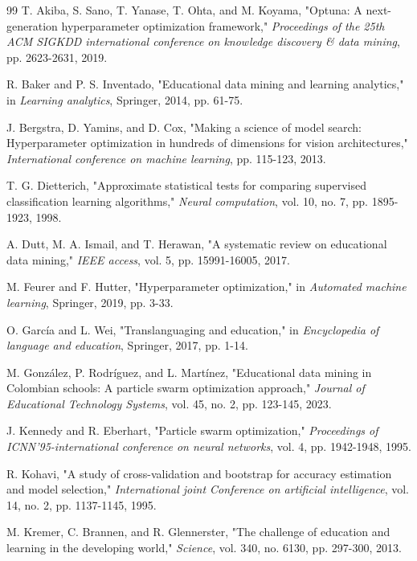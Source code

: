 \documentclass[conference]{IEEEtran}
\begin{document}
\begin{thebibliography}{99}
 T. Akiba, S. Sano, T. Yanase, T. Ohta, and M. Koyama, "Optuna: A next-generation hyperparameter optimization framework," \textit{Proceedings of the 25th ACM SIGKDD international conference on knowledge discovery \& data mining}, pp. 2623-2631, 2019.

 R. Baker and P. S. Inventado, "Educational data mining and learning analytics," in \textit{Learning analytics}, Springer, 2014, pp. 61-75.

 J. Bergstra, D. Yamins, and D. Cox, "Making a science of model search: Hyperparameter optimization in hundreds of dimensions for vision architectures," \textit{International conference on machine learning}, pp. 115-123, 2013.

 T. G. Dietterich, "Approximate statistical tests for comparing supervised classification learning algorithms," \textit{Neural computation}, vol. 10, no. 7, pp. 1895-1923, 1998.

 A. Dutt, M. A. Ismail, and T. Herawan, "A systematic review on educational data mining," \textit{IEEE access}, vol. 5, pp. 15991-16005, 2017.

 M. Feurer and F. Hutter, "Hyperparameter optimization," in \textit{Automated machine learning}, Springer, 2019, pp. 3-33.

 O. García and L. Wei, "Translanguaging and education," in \textit{Encyclopedia of language and education}, Springer, 2017, pp. 1-14.

 M. González, P. Rodríguez, and L. Martínez, "Educational data mining in Colombian schools: A particle swarm optimization approach," \textit{Journal of Educational Technology Systems}, vol. 45, no. 2, pp. 123-145, 2023.

 J. Kennedy and R. Eberhart, "Particle swarm optimization," \textit{Proceedings of ICNN'95-international conference on neural networks}, vol. 4, pp. 1942-1948, 1995.

 R. Kohavi, "A study of cross-validation and bootstrap for accuracy estimation and model selection," \textit{International joint Conference on artificial intelligence}, vol. 14, no. 2, pp. 1137-1145, 1995.

 M. Kremer, C. Brannen, and R. Glennerster, "The challenge of education and learning in the developing world," \textit{Science}, vol. 340, no. 6130, pp. 297-300, 2013.


\end{thebibliography}
\end{document}
